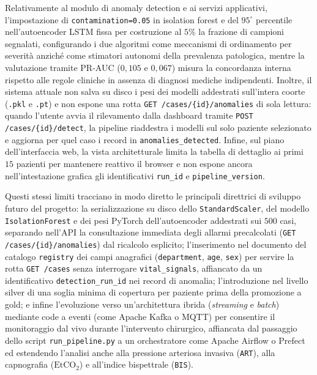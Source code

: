 Relativamente al modulo di anomaly detection e ai servizi applicativi, l'impostazione di \texttt{contamination=0.05} in isolation forest e del $95^\circ$ percentile nell'autoencoder LSTM fissa per costruzione al $5\%$ la frazione di campioni segnalati, configurando i due algoritmi come meccanismi di ordinamento per severit\`a anzich\'e come stimatori autonomi della prevalenza patologica, mentre la valutazione tramite PR-AUC ($0,105$ e $0,067$) misura la concordanza interna rispetto alle regole cliniche in assenza di diagnosi mediche indipendenti. Inoltre, il sistema attuale non salva su disco i pesi dei modelli addestrati sull'intera coorte (\texttt{.pkl} e \texttt{.pt}) e non espone una rotta \texttt{GET /cases/\{id\}/anomalies} di sola lettura: quando l'utente avvia il rilevamento dalla dashboard tramite \texttt{POST /cases/\{id\}/detect}, la pipeline riaddestra i modelli sul solo paziente selezionato e aggiorna per quel caso i record in \texttt{anomalies\_detected}. Infine, sul piano dell'interfaccia web, la vista architetturale limita la tabella di dettaglio ai primi $15$ pazienti per mantenere reattivo il browser e non espone ancora nell'intestazione grafica gli identificativi \texttt{run\_id} e \texttt{pipeline\_version}.

Questi stessi limiti tracciano in modo diretto le principali direttrici di sviluppo futuro del progetto: la serializzazione su disco dello \texttt{StandardScaler}, del modello \texttt{IsolationForest} e dei pesi PyTorch dell'autoencoder addestrati sui $500$ casi, separando nell'API la consultazione immediata degli allarmi precalcolati (\texttt{GET /cases/\{id\}/anomalies}) dal ricalcolo esplicito; l'inserimento nel documento del catalogo \texttt{registry} dei campi anagrafici (\texttt{department}, \texttt{age}, \texttt{sex}) per servire la rotta \texttt{GET /cases} senza interrogare \texttt{vital\_signals}, affiancato da un identificativo \texttt{detection\_run\_id} nei record di anomalia; l'introduzione nel livello silver di una soglia minima di copertura per paziente prima della promozione a gold; e infine l'evoluzione verso un'architettura ibrida (\textit{streaming} e \textit{batch}) mediante code a eventi (come Apache Kafka o MQTT) per consentire il monitoraggio dal vivo durante l'intervento chirurgico, affiancata dal passaggio dello script \texttt{run\_pipeline.py} a un orchestratore come Apache Airflow o Prefect ed estendendo l'analisi anche alla pressione arteriosa invasiva (\texttt{ART}), alla capnografia ($\text{EtCO}_2$) e all'indice bispettrale (\texttt{BIS}).\enlargethispage{\baselineskip}
